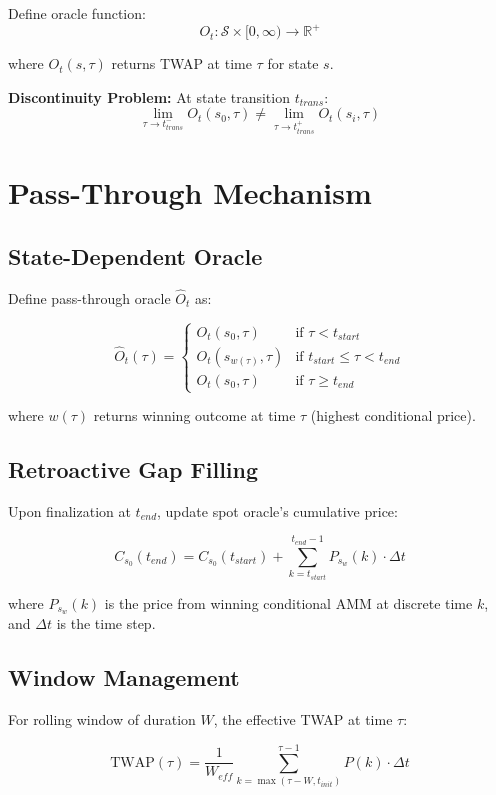 \documentclass{article}
\begin{document}
Define oracle function:
$$O_t: \mathcal{S} \times [0, \infty) \to \mathbb{R}^+$$

where $O_t(s, \tau)$ returns TWAP at time $\tau$ for state $s$.

\textbf{Discontinuity Problem:} At state transition $t_{trans}$:
$$\lim_{\tau \to t_{trans}^-} O_t(s_0, \tau) \neq \lim_{\tau \to t_{trans}^+} O_t(s_i, \tau)$$

\section{Pass-Through Mechanism}

\subsection{State-Dependent Oracle}

Define pass-through oracle $\hat{O}_t$ as:

$$\hat{O}_t(\tau) = \begin{cases}
O_t(s_0, \tau) & \text{if } \tau < t_{start} \\
O_t(s_{w(\tau)}, \tau) & \text{if } t_{start} \leq \tau < t_{end} \\
O_t(s_0, \tau) & \text{if } \tau \geq t_{end}
\end{cases}$$

where $w(\tau)$ returns winning outcome at time $\tau$ (highest conditional price).

\subsection{Retroactive Gap Filling}

Upon finalization at $t_{end}$, update spot oracle's cumulative price:

$$C_{s_0}(t_{end}) = C_{s_0}(t_{start}) + \sum_{k=t_{start}}^{t_{end}-1} P_{s_w}(k) \cdot \Delta t$$

where $P_{s_w}(k)$ is the price from winning conditional AMM at discrete time $k$, and $\Delta t$ is the time step.

\subsection{Window Management}

For rolling window of duration $W$, the effective TWAP at time $\tau$:

$$\text{TWAP}(\tau) = \frac{1}{W_{eff}} \sum_{k=\max(\tau - W, t_{init})}^{\tau-1} P(k) \cdot \Delta t$$
\end{document}
